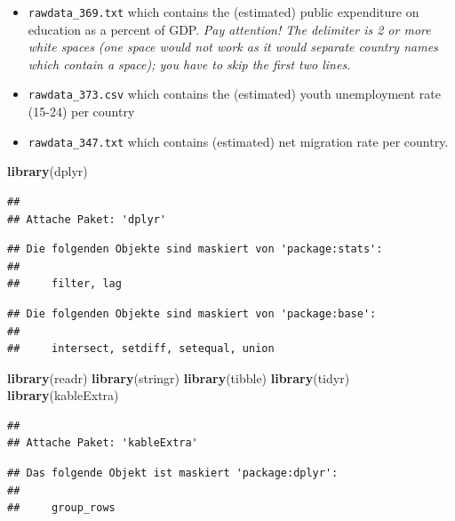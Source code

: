 \documentclass[
]{article}
\newenvironment{Shaded}{\begin{snugshade}}{\end{snugshade}}
\newcommand{\FunctionTok}[1]{\textcolor[rgb]{0.13,0.29,0.53}{\textbf{#1}}}
\newcommand{\NormalTok}[1]{#1}
\begin{document}
\begin{itemize}
\item
  \texttt{rawdata\_369.txt} which contains the (estimated) public
  expenditure on education as a percent of GDP. \emph{Pay attention! The
  delimiter is 2 or more white spaces (one space would not work as it
  would separate country names which contain a space); you have to skip
  the first two lines}.
\item
  \texttt{rawdata\_373.csv} which contains the (estimated) youth
  unemployment rate (15-24) per country
\item
  \texttt{rawdata\_347.txt} which contains (estimated) net migration
  rate per country.
\end{itemize}

\begin{Shaded}
\begin{Highlighting}[]
\FunctionTok{library}\NormalTok{(dplyr)}
\end{Highlighting}
\end{Shaded}

\begin{verbatim}
## 
## Attache Paket: 'dplyr'
\end{verbatim}

\begin{verbatim}
## Die folgenden Objekte sind maskiert von 'package:stats':
## 
##     filter, lag
\end{verbatim}

\begin{verbatim}
## Die folgenden Objekte sind maskiert von 'package:base':
## 
##     intersect, setdiff, setequal, union
\end{verbatim}

\begin{Shaded}
\begin{Highlighting}[]
\FunctionTok{library}\NormalTok{(readr)}
\FunctionTok{library}\NormalTok{(stringr)}
\FunctionTok{library}\NormalTok{(tibble)}
\FunctionTok{library}\NormalTok{(tidyr)}
\FunctionTok{library}\NormalTok{(kableExtra)}
\end{Highlighting}
\end{Shaded}

\begin{verbatim}
## 
## Attache Paket: 'kableExtra'
\end{verbatim}

\begin{verbatim}
## Das folgende Objekt ist maskiert 'package:dplyr':
## 
##     group_rows
\end{verbatim}
\end{document}
